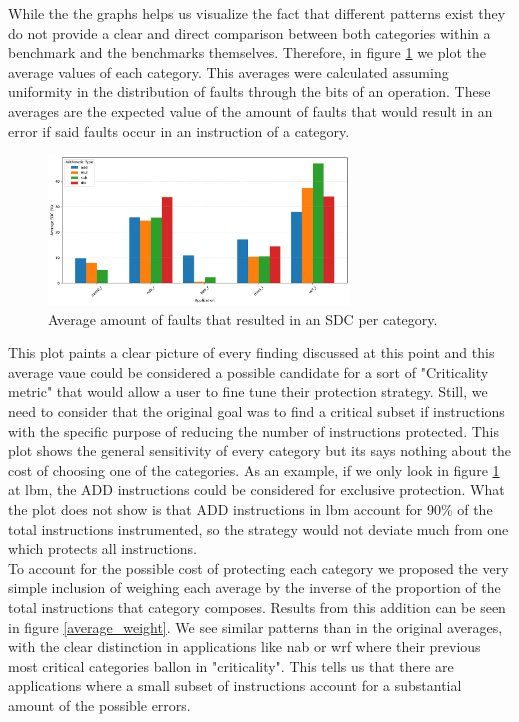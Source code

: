 \documentclass[lettersize,journal]{IEEEtran}
\begin{document}
While the the graphs helps us visualize the fact that different patterns exist they do not provide a clear and direct comparison between both categories within a benchmark and the benchmarks themselves. Therefore, in figure \ref{average} we plot the average values of each category. This averages were calculated assuming uniformity in the distribution of faults through the bits of an operation. These averages are the expected value of the amount of faults that would result in an error if said faults occur in an instruction of a category.
\begin{figure}[!t] 
    \centering
    \includegraphics[width=8cm]{plots/average_arithmetic/benchmarks_grouped_by_category.pdf}
\caption{Average amount of faults that resulted in an SDC per category.}
\label{average}
\end{figure}
This plot paints a clear picture of every finding discussed at this point and this average vaue could be considered a possible candidate for a sort of "Criticality metric" that would allow a user to fine tune their protection strategy. Still, we need to consider that the original goal was to find a critical subset if instructions with the specific purpose of reducing the number of instructions protected. This plot shows the general sensitivity of every category but its says nothing about the cost of choosing one of the categories. As an example, if we only look in figure \ref{average} at lbm, the ADD instructions could be considered for exclusive protection. What the plot does not show is that ADD instructions in lbm account for 90\% of the total instructions instrumented, so the strategy would not deviate much from one which protects all instructions. \\
To account for the possible cost of protecting each category we proposed the very simple inclusion of weighing each average by the inverse of the proportion of the total instructions that category composes. Results from this addition can be seen in figure \ref{average_weight}. We see similar patterns than in the original averages, with the clear distinction in applications like nab or wrf where their previous most critical categories ballon in "criticality". This tells us that there are applications where a small subset of instructions account for a substantial amount of the possible errors. 
\end{document}
